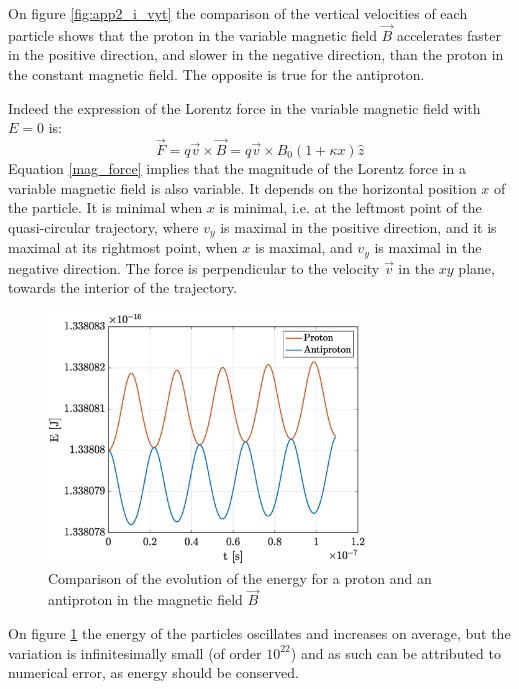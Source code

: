 \documentclass[a4paper,12pt,twoside]{article}
\begin{document}
On figure \ref{fig:app2_i_vyt} the comparison of the vertical velocities of each particle shows that the proton in the variable magnetic field $\vec{B}$ accelerates faster in the positive direction, and slower in the negative direction, than the proton in the constant magnetic field. The opposite is true for the antiproton.

Indeed the expression of the Lorentz force in the variable magnetic field with $E=0$ is:
\begin{equation}
	\vec{F} = q\vec{v} \times \vec{B} = q\vec{v} \times B_0(1+\kappa x)\hat{z}
	\label{mag_force}
\end{equation}
Equation \ref{mag_force} implies that the magnitude of the Lorentz force in a variable magnetic field is also variable. It depends on the horizontal position $x$ of the particle. It is minimal when $x$ is minimal, i.e. at the leftmost point of the quasi-circular trajectory, where $v_y$ is maximal in the positive direction, and it is maximal at its rightmost point, when $x$ is maximal, and $v_y$ is maximal in the negative direction. The force is perpendicular to the velocity $\vec{v}$ in the $xy$ plane, towards the interior of the trajectory.

\begin{figure}[h]
\centering
	\includegraphics[width=0.75\textwidth]{graphs/app2_i_ene.eps}
	\caption{Comparison of the evolution of the energy for a proton and an antiproton in the magnetic field $\vec{B}$}
	\label{fig:app2_i_ene}
\end{figure}

On figure \ref{fig:app2_i_ene} the energy of the particles oscillates and increases on average, but the variation is infinitesimally small (of order $10^{22}$) and as such can be attributed to numerical error, as energy should be conserved.
\end{document}

